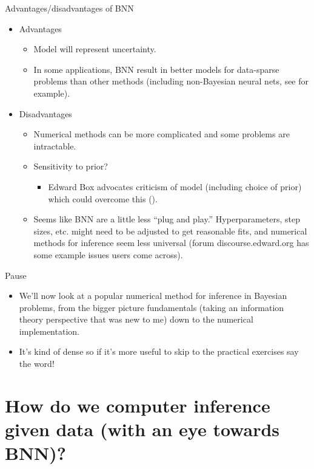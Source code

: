 \documentclass{beamer}
\begin{document}
\begin{frame}{Advantages/disadvantages of BNN}
  \begin{itemize}
  \item Advantages
    \begin{itemize}
    \item Model will represent uncertainty.
    \item In some applications, BNN result in better models for data-sparse problems than other methods (including non-Bayesian neural nets, see \cite{xiong2011} for example).
    \end{itemize}
  \item Disadvantages
    \begin{itemize}
    \item Numerical methods can be more complicated and some problems are intractable.
    \item Sensitivity to prior?
      \begin{itemize}
      \item Edward Box advocates criticism of model (including choice of prior) which could overcome this (\cite{box1982}).
      \end{itemize}
      \item Seems like BNN are a little less ``plug and play.'' Hyperparameters, step sizes, etc. might need to be adjusted to get reasonable fits, and numerical methods for inference seem less universal (forum discourse.edward.org has some example issues users come across).
    \end{itemize}
  \end{itemize}
\end{frame}

\begin{frame}{Pause}
  \begin{itemize}
  \item We'll now look at a popular numerical method for inference in Bayesian problems, from the bigger picture fundamentals (taking an information theory perspective that was new to me) down to the numerical implementation.
  \item It's kind of dense so if it's more useful to skip to the practical exercises say the word!
  \end{itemize}
\end{frame}

\section{How do we computer inference given data (with an eye towards BNN)?}
\end{document}
